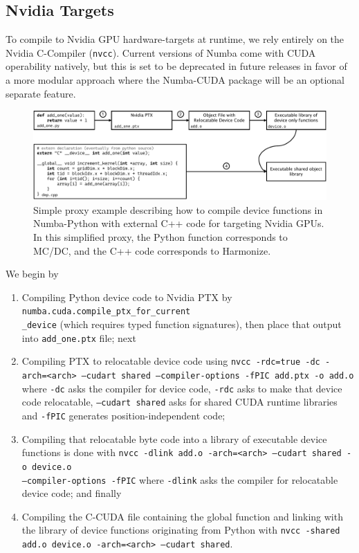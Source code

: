 \subsection{Nvidia Targets}

To compile to Nvidia GPU hardware-targets at runtime, we rely entirely on the Nvidia C-Compiler (\texttt{nvcc}).
Current versions of Numba come with CUDA operability natively, but this is set to be deprecated in future releases in favor of a more modular approach where the Numba-CUDA package will be an optional separate feature.

\begin{figure}
  \centering
  \includegraphics[width=\textwidth]{appendix/mcdc_prof_figs/flownvcc.pdf}
  \caption{Simple proxy example describing how to compile device functions in Numba-Python with external C++ code for targeting Nvidia GPUs. In this simplified proxy, the Python function corresponds to MC/DC, and the C++ code corresponds to Harmonize.}
  \label{fig:codenvcc}
\end{figure}

We begin by
\begin{enumerate}
    \item Compiling Python device code to Nvidia PTX by \texttt{numba.cuda.compile\_ptx\_for\_current\\\_device} (which requires typed function signatures), then place that output into \texttt{add\_one.ptx} file; next
    
    \item Compiling PTX to relocatable device code using \texttt{nvcc -rdc=true -dc -arch=<arch> --cudart shared --compiler-options -fPIC add.ptx -o add.o} where \texttt{-dc} asks the compiler for device code, \texttt{-rdc} asks to make that device code relocatable, \texttt{--cudart shared} asks for shared CUDA runtime libraries and \texttt{-fPIC} generates position-independent code;
    
    \item Compiling that relocatable byte code into a library of executable device functions is done with \texttt{nvcc -dlink add.o -arch=<arch> --cudart shared -o device.o \\--compiler-options -fPIC} where \texttt{-dlink} asks the compiler for relocatable device code; and finally
    
    \item Compiling the C-CUDA file containing the global function and linking with the library of device functions originating from Python with \texttt{nvcc -shared add.o device.o -arch=<arch> --cudart shared}.
    
\end{enumerate}

